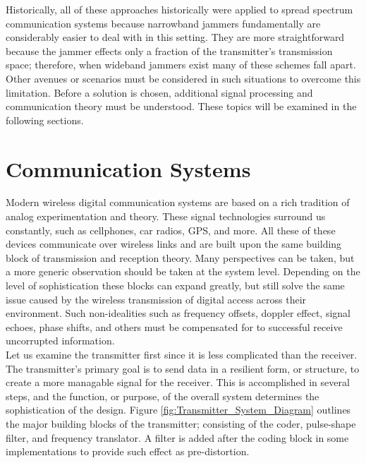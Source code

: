 Historically, all of these approaches historically were applied to spread spectrum communication systems because narrowband jammers fundamentally are considerably easier to deal with in this setting.  They are more straightforward because the jammer effects only a fraction of the transmitter's transmission space; therefore, when wideband jammers exist many of these schemes fall apart.  Other avenues or scenarios must be considered in such situations to overcome this limitation.  Before a solution is chosen, additional signal processing and communication theory must be understood.  These topics will be examined in the following sections.\\



\section{Communication Systems}

Modern wireless digital communication systems are based on a rich tradition of analog experimentation and theory.  These signal technologies surround us constantly, such as cellphones, car radios, GPS, and more.  All these of these devices communicate over wireless links and are built upon the same building block of transmission and reception theory.  Many perspectives can be taken, but a more generic observation should be taken at the system level.  Depending on the level of sophistication these blocks can expand greatly, but still solve the same issue caused by the wireless transmission of digital access across their environment.  Such non-idealities such as frequency offsets, doppler effect, signal echoes, phase shifts, and others must be compensated for to successful receive uncorrupted information.\\ 

Let us examine the transmitter first since it is less complicated than the receiver.  The transmitter's primary goal is to send data in a resilient form, or structure, to create a more managable signal for the receiver.  This is accomplished in several steps, and the function, or purpose, of the overall system determines the sophistication of the design.  Figure \ref{fig:Transmitter_System_Diagram} outlines the major building blocks of the transmitter; consisting of the coder, pulse-shape filter, and frequency translator.  A filter is added after the coding block in some implementations to provide such effect as pre-distortion.\\


